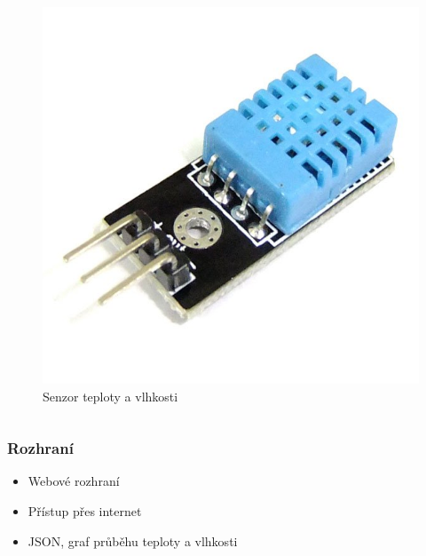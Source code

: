 \documentclass{beamer}
\begin{document}
\begin{frame}
\begin{columns}
				\begin{figure}
					\includegraphics[scale=0.2]{humidity.jpg}			
					\caption{Senzor teploty a vlhkosti}
				\end{figure}		
		\end{columns}				
	\end{frame}

	\begin{frame}
		\frametitle{Rozhraní}
		\begin{itemize}
			\item Webové rozhraní
			\item Přístup přes internet
			\item JSON, graf průběhu teploty a vlhkosti 			
		\end{itemize}
	\end{frame}
\end{document}
